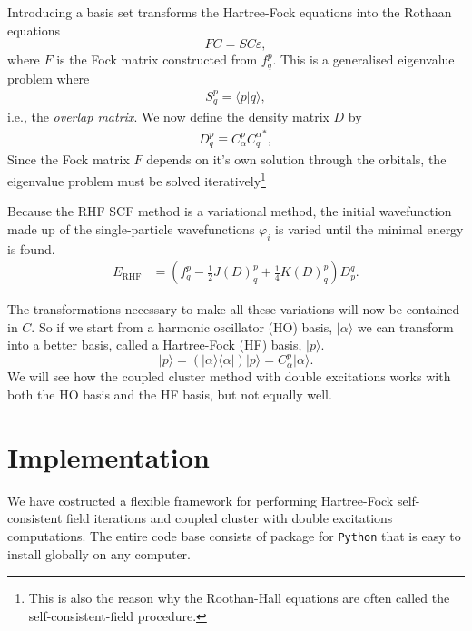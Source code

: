 \documentclass[
    a4paper, aps, twocolumn, floatfix, superscriptaddress,
    nofootinbib]{revtex4-1}
\newcommand{\1}{\mathds{1}}
\newcommand{\para}[1]{\left(#1\right)}
\newcommand{\half}{\frac{1}{2}}
\newcommand{\bra}[1]{\langle #1\lvert}
\newcommand{\ket}[1]{\rvert #1\rangle}
\newcommand{\braket}[2]{\langle #1 \vert #2 \rangle}
\begin{document}
            Introducing a basis set transforms the Hartree-Fock equations into
            the Rothaan equations
            \begin{equation}
                FC = SC\varepsilon,
            \end{equation}
            where $F$ is the Fock matrix constructed from $f^p_q$.  This is a
            generalised eigenvalue problem where
            \begin{align}
                S^{p}_{q} = \braket{p}{q},
            \end{align}
            i.e., the \emph{overlap matrix}. We now define the density matrix
            $D$ by
            \begin{align}
                D^{p}_{q} \equiv C^p_{\alpha}{C^{\alpha}_q}^{*},
            \end{align}
            Since the Fock matrix $F$ depends on it's own solution through the
            orbitals, the eigenvalue problem must be solved
            iteratively\footnote{This is also the reason why the Roothan-Hall
            equations are often called the self-consistent-field procedure.}

            Because the RHF SCF method is a variational method, the initial
            wavefunction made up of the single-particle wavefunctions
            $\varphi_i$ is varied until the minimal energy is found.
            \begin{align}
                E_{\text{RHF}}
                &= \para{
                    f^p_q - \half J(D)^p_q + \frac{1}{4}K(D)^p_q
                }D^q_p.
            \end{align}

            The transformations necessary to make all these variations will now
            be contained in $C$. So if we start from a harmonic oscillator (HO)
            basis, $\ket{\alpha}$ we can transform into a better basis, called a
            Hartree-Fock (HF) basis, $\ket{p}$.
            \begin{equation}
                \ket{p}
                = \para{\ket{\alpha}\bra{\alpha}}\ket{p}
                = C^p_\alpha\ket{\alpha}.
            \end{equation}
            We will see how the coupled cluster method with double excitations
            works with both the HO basis and the HF basis, but not equally well.

\section{Implementation}
    We have costructed a flexible framework for performing Hartree-Fock
    self-consistent field iterations and coupled cluster with double excitations
    computations. The entire code base consists of package for
    \lstinline{Python} that is easy to install globally on any computer.
\end{document}
